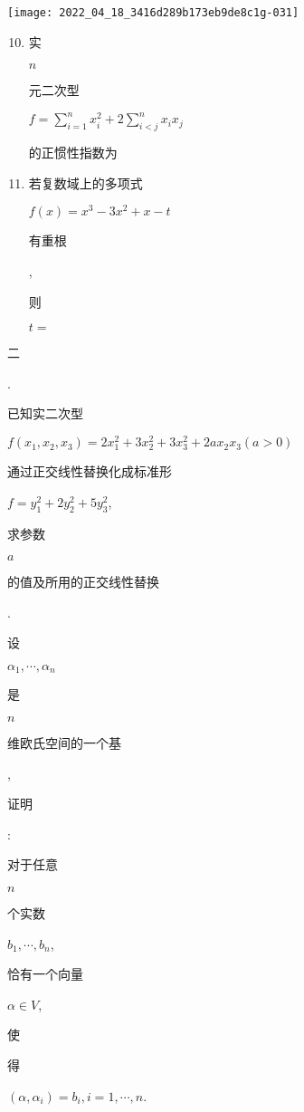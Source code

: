 \documentclass[10pt]{article}
\begin{document}
\texttt{[image: 2022\_04\_18\_3416d289b173eb9de8c1g-031]}

\begin{enumerate}
  \setcounter{enumi}{9}
  \item \begin{CJK}{UTF8}{mj}实\end{CJK} $n$ \begin{CJK}{UTF8}{mj}元二次型\end{CJK} $f=\sum_{i=1}^{n} x_{i}^{2}+2 \sum_{i<j}^{n} x_{i} x_{j}$ \begin{CJK}{UTF8}{mj}的正惯性指数为\end{CJK}

  \item \begin{CJK}{UTF8}{mj}若复数域上的多项式\end{CJK} $f(x)=x^{3}-3 x^{2}+x-t$ \begin{CJK}{UTF8}{mj}有重根\end{CJK}, \begin{CJK}{UTF8}{mj}则\end{CJK} $t=$

\end{enumerate}
\begin{CJK}{UTF8}{mj}二\end{CJK}. \begin{CJK}{UTF8}{mj}已知实二次型\end{CJK} $f\left(x_{1}, x_{2}, x_{3}\right)=2 x_{1}^{2}+3 x_{2}^{2}+3 x_{3}^{2}+2 a x_{2} x_{3}(a>0)$ \begin{CJK}{UTF8}{mj}通过正交线性替换化成标准形\end{CJK} $f=y_{1}^{2}+2 y_{2}^{2}+5 y_{3}^{2}$, \begin{CJK}{UTF8}{mj}求参数\end{CJK} $a$ \begin{CJK}{UTF8}{mj}的值及所用的正交线性替换\end{CJK}.

\begin{CJK}{UTF8}{mj}设\end{CJK} $\alpha_{1}, \cdots, \alpha_{n}$ \begin{CJK}{UTF8}{mj}是\end{CJK} $n$ \begin{CJK}{UTF8}{mj}维欧氏空间的一个基\end{CJK}, \begin{CJK}{UTF8}{mj}证明\end{CJK}: \begin{CJK}{UTF8}{mj}对于任意\end{CJK} $n$ \begin{CJK}{UTF8}{mj}个实数\end{CJK} $b_{1}, \cdots, b_{n}$, \begin{CJK}{UTF8}{mj}恰有一个向量\end{CJK} $\alpha \in V$, \begin{CJK}{UTF8}{mj}使\end{CJK} \begin{CJK}{UTF8}{mj}得\end{CJK} $\left(\alpha, \alpha_{i}\right)=b_{i}, i=1, \cdots, n$.
\end{document}
